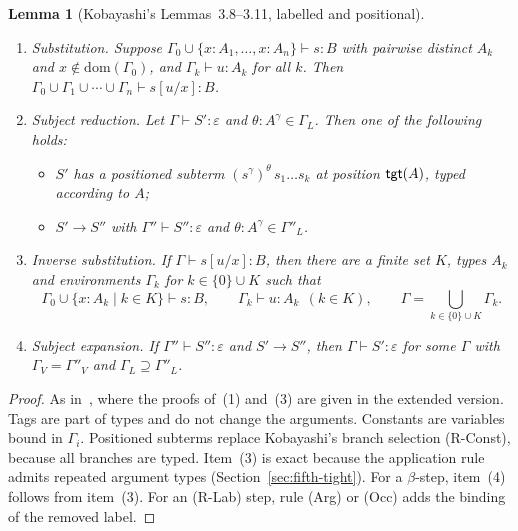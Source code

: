\documentclass[10pt,a4paper]{article}
\theoremstyle{plain}%
\newtheorem{lemma}[theorem]{Lemma}
\begin{document}
\begin{lemma}[Kobayashi's Lemmas~3.8--3.11, labelled and positional]\label{lem:fifth-kob}
\leavevmode
\begin{enumerate}
\item \emph{Substitution.}
Suppose $\Gamma_0 \cup \{x : A_1, \ldots, x : A_n\} \vdash s : B$ with pairwise distinct $A_k$ and $x \notin \mathrm{dom}(\Gamma_0)$, and $\Gamma_k \vdash u : A_k$ for all $k$.
Then $\Gamma_0 \cup \Gamma_1 \cup \cdots \cup \Gamma_n \vdash s[u/x] : B$.
\item \emph{Subject reduction.}
Let $\Gamma \vdash S' : \varepsilon$ and $\theta : A^\gamma \in \Gamma_L$.
Then one of the following holds:
  \begin{itemize}
  \item $S'$ has a positioned subterm $(s^\gamma)^\theta\,s_1\ldots s_k$ at position $\mathsf{tgt}(A)$, typed according to $A$;
  \item $S' \to S''$ with $\Gamma'' \vdash S'' : \varepsilon$ and $\theta : A^\gamma \in \Gamma''_L$.
  \end{itemize}
\item \emph{Inverse substitution.}
If $\Gamma \vdash s[u/x] : B$, then there are a finite set $K$, types $A_k$ and environments $\Gamma_k$ for $k \in \{0\} \cup K$ such that
\[
\Gamma_0 \cup \{x : A_k \mid k \in K\} \vdash s : B,
\qquad
\Gamma_k \vdash u : A_k \ \ (k \in K),
\qquad
\Gamma = \bigcup_{k \in \{0\} \cup K} \Gamma_k .
\]
\item \emph{Subject expansion.}
If $\Gamma'' \vdash S'' : \varepsilon$ and $S' \to S''$, then $\Gamma \vdash S' : \varepsilon$ for some $\Gamma$ with $\Gamma_V = \Gamma''_V$ and $\Gamma_L \supseteq \Gamma''_L$.
\end{enumerate}
\end{lemma}

\begin{proof}
As in~\cite{Kobayashi13}, where the proofs of~(1) and~(3) are given in the extended version.
Tags are part of types and do not change the arguments.
Constants are variables bound in $\Gamma_i$.
Positioned subterms replace Kobayashi's branch selection (R-Const), because all branches are typed.
Item~(3) is exact because the application rule admits repeated argument types (Section~\ref{sec:fifth-tight}).
For a $\beta$-step, item~(4) follows from item~(3).
For an (R-Lab) step, rule (Arg) or (Occ) adds the binding of the removed label.
\end{proof}
\end{document}
